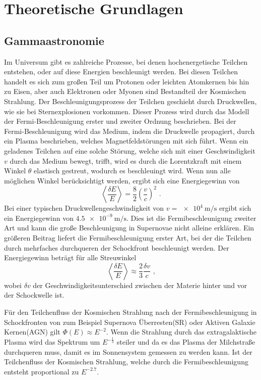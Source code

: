 \chapter{Theoretische Grundlagen}

\section{Gammaastronomie}

Im Universum gibt es zahlreiche Prozesse, bei denen hochenergetische Teilchen entstehen, oder auf diese Energien beschleunigt werden.
Bei diesen Teilchen handelt es sich zum großen Teil um Protonen oder leichten  Atomkernen bis hin zu Eisen, aber auch Elektronen oder Myonen
sind Bestandteil der Kosmischen Strahlung.
Der Beschleunigungsprozess der Teilchen geschieht durch Druckwellen, wie sie bei Sternexplosionen vorkommen.
Dieser Prozess wird durch das Modell der Fermi-Beschleunigung erster und zweiter Ordnung beschrieben.
Bei der Fermi-Beschleunigung wird das Medium, indem die Druckwelle propagiert, durch ein Plasma beschrieben, welches Magnetfeldstörungen mit sich führt.
Wenn ein geladenes Teilchen auf eine solche Störung, welche sich mit einer Geschwindigkeit $v$ durch das Medium bewegt, trifft, wird es durch die
Lorentzkraft mit einem Winkel $\theta$ elastisch gestreut, wodurch es beschleuingt wird.
Wenn nun alle möglichen Winkel berücksichtigt werden, ergibt sich eine Energiegewinn von
\begin{equation*}
  \left\langle \frac{\delta E}{E} \right\rangle = \frac{8}{2}\left(\frac{v}{c}\right)^2\text{ .}
\end{equation*}
Bei einer typischen Druckwellengeschwindigkeit von $v=\SI{e4}{\m\per\s}$\cite[14]{HESS} ergibt sich ein Energiegewinn von $\SI{4.5e-9}{\m\per\s}$.
Dies ist die Fermibeschleunigung zweiter Art und kann die große Beschleunigung in Supernovae nicht alleine erklären.
Ein größeren Beitrag liefert die Fermibeschleunigung erster Art, bei der die Teilchen durch mehrfaches durchqueren der Schockfront beschleunigt werden.
Der Energiegewinn beträgt für alle Streuwinkel
\begin{equation*}
  \left\langle \frac{\delta E}{E} \right\rangle \approx \frac{2}{3}\frac{\delta v}{c} \text{ ,}
\end{equation*}
wobei $\delta v$ der Geschwindigkeitsunterschied zwischen der Materie hinter und vor der Schockwelle ist.

Für den Teilchenfluss der Kosmischen Strahlung nach der Fermibeschleunigung in Schockfronten von zum Beispiel Supernova Überresten(SR) oder Aktiven
Galaxie Kernen(AGN) gilt $\Phi(E)\approx E^{-2}$. Wenn die Strahlung durch das extragalaktische Plasma wird das Spektrum um $E^{-\frac{1}{3}}$ steiler und
da es das Plasma der Milchstraße durchqueren muss, damit es im Sonnensystem gemessen zu werden kann. Ist der Teilchenfluss der Kosmischen Strahlung, welche
durch die Fermibeschleunigung entsteht proportional zu $E^{-2.7}$\cite[5]{Cosmic_rays}.

